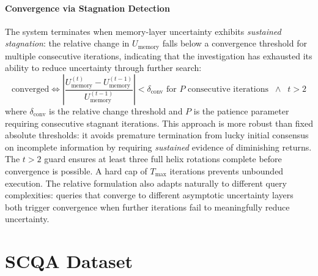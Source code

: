 \documentclass{article}
\begin{document}
\paragraph{Convergence via Stagnation Detection}
The system terminates when memory-layer uncertainty exhibits \textit{sustained stagnation}: the relative change in $U_{\text{memory}}$ falls below a convergence threshold for multiple consecutive iterations, indicating that the investigation has exhausted its ability to reduce uncertainty through further search:
\begin{equation}
\text{converged} \iff \left|\frac{U_{\text{memory}}^{(t)} - U_{\text{memory}}^{(t-1)}}{U_{\text{memory}}^{(t-1)}}\right| < \delta_{\text{conv}} \text{ for } P \text{ consecutive iterations} \;\;\wedge\;\; t > 2
\end{equation}
where $\delta_{\text{conv}}$ is the relative change threshold and $P$ is the patience parameter requiring consecutive stagnant iterations. This approach is more robust than fixed absolute thresholds: it avoids premature termination from lucky initial consensus on incomplete information by requiring \textit{sustained} evidence of diminishing returns. The $t > 2$ guard ensures at least three full helix rotations complete before convergence is possible. A hard cap of $T_{\max}$ iterations prevents unbounded execution. The relative formulation also adapts naturally to different query complexities: queries that converge to different asymptotic uncertainty layers both trigger convergence when further iterations fail to meaningfully reduce uncertainty.



\section{SCQA Dataset}
\label{sec:dataset}
\end{document}
